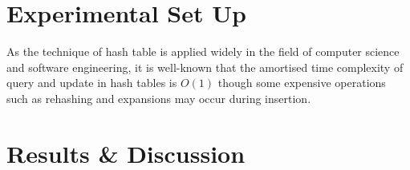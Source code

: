 \documentclass[a4paper, 11pt]{article}
\begin{document}
    \section{Experimental Set Up}
        As the technique of hash table is applied widely in the field of computer science and software engineering, it is well-known that the amortised time complexity of query and update in hash tables is $O \left( 1 \right)$ though some expensive operations such as rehashing and expansions may occur during insertion.
    \section{Results \& Discussion}
\end{document}

